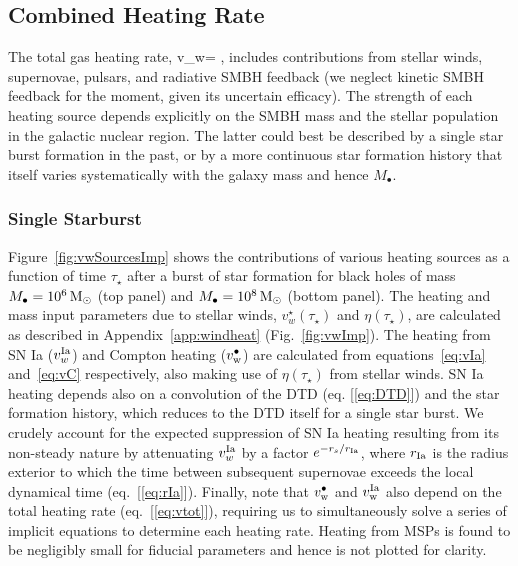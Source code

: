 \documentclass[usenatbib,fleqn]{mn2e}
\newcommand{\rs}{r_s}
\newcommand{\Mbh}[1][]{M_{\bullet#1}}
\newcommand{\rIa}{r_{\rm Ia}}
\newcommand{\vwO}{v_{w}}
\begin{document}
\subsection{Combined Heating Rate} 
\label{sec:combined}


The total gas heating rate, 
\be
\vwO = ,
\label{eq:vtot}
\ee
includes contributions from stellar winds, supernovae, pulsars, and radiative SMBH feedback (we neglect kinetic SMBH feedback for the moment, given its uncertain efficacy).  The strength of each heating source depends explicitly on the SMBH mass and the stellar population in the galactic nuclear region.  The latter could best be described by a single star burst formation in the past, or by a more continuous star formation history that itself varies systematically with the galaxy mass and hence $\Mbh$.

\subsubsection{Single Starburst}

Figure~\ref{fig:vwSourcesImp} shows the contributions of various heating sources as a function of time $\tau_{\star}$ after a burst of star formation for black holes of mass $\Mbh = 10^{6} \Msun$ (top panel) and $\Mbh = 10^{8} \Msun$ (bottom panel). The heating and mass input parameters due to stellar winds, $v_{w}^{\star}(\tau_{\star})$ and $\eta(\tau_{\star})$, are calculated as described in Appendix~\ref{app:windheat} (Fig.~\ref{fig:vwImp}).  The heating from SN Ia ($v_{w}^{\rm Ia}$) and Compton heating ($v_{\rm w}^{\bullet}$) are calculated from equations~\eqref{eq:vIa} and~\eqref{eq:vC} respectively, also making use of $\eta(\tau_{\star})$ from stellar winds.  SN Ia heating depends also on a convolution of the DTD (eq. [\ref{eq:DTD}]) and the star formation history, which reduces to the DTD itself for a single star burst.  We crudely account for the expected suppression of SN Ia heating resulting from its non-steady nature by attenuating $v_{w}^{\rm Ia}$ by a factor $e^{-\rs/\rIa}$, where $r_{\rm Ia}$ is the radius exterior to which the time between subsequent supernovae exceeds the local dynamical time (eq.~[\ref{eq:rIa}]).  Finally, note that $v_{\rm w}^{\bullet}$ and $v_{\rm w}^{\rm Ia}$ also depend on the total heating rate (eq.~[\ref{eq:vtot}]), requiring us to simultaneously solve a series of implicit equations to determine each heating rate.  Heating from MSPs is found to be negligibly small for fiducial parameters and hence is not plotted for clarity.  
\end{document}
